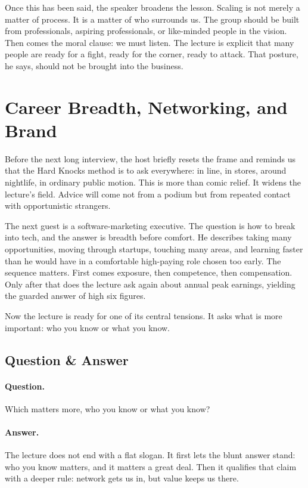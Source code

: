 Once this has been said, the speaker broadens the lesson. Scaling is not merely a matter of process. It is a matter of who surrounds us. The group should be built from professionals, aspiring professionals, or like-minded people in the vision. Then comes the moral clause: we must listen. The lecture is explicit that many people are ready for a fight, ready for the corner, ready to attack. That posture, he says, should not be brought into the business.

\section{Career Breadth, Networking, and Brand}

Before the next long interview, the host briefly resets the frame and reminds us that the Hard Knocks method is to ask everywhere: in line, in stores, around nightlife, in ordinary public motion. This is more than comic relief. It widens the lecture's field. Advice will come not from a podium but from repeated contact with opportunistic strangers.

The next guest is a software-marketing executive. The question is how to break into tech, and the answer is breadth before comfort. He describes taking many opportunities, moving through startups, touching many areas, and learning faster than he would have in a comfortable high-paying role chosen too early. The sequence matters. First comes exposure, then competence, then compensation. Only after that does the lecture ask again about annual peak earnings, yielding the guarded answer of high six figures.

Now the lecture is ready for one of its central tensions. It asks what is more important: who you know or what you know.

\subsection{Question \& Answer}

\paragraph{Question.} Which matters more, who you know or what you know?

\paragraph{Answer.} The lecture does not end with a flat slogan. It first lets the blunt answer stand: who you know matters, and it matters a great deal. Then it qualifies that claim with a deeper rule: network gets us in, but value keeps us there.


